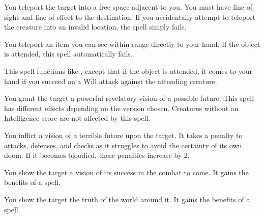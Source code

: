 \spellrng{\rngmed}
\begin{spelleffect}
    You teleport the target into a free space adjacent to you. You must have line of sight and line of effect to the destination. If you accidentally attempt to teleport the creature into an invalid location, the spell simply fails.
\end{spelleffect}

\spellrng{\rngclose}
\begin{spelleffect}
  You teleport an item you can see within range directly to your hand. If the object is attended, this spell automatically fails.
\end{spelleffect}

\spellrng{\rngmed}
\begin{spelleffect}
  This spell functions like , except that if the object is attended, it comes to your hand if you succeed on a Will attack against the attending creature.
\end{spelleffect}

\spellrng{\rngmed}
\spelldur{\durshort}
\begin{spelleffect}
  You grant the target a powerful revelatory vision of a possible future. This spell has different effects depending on the version chosen. Creatures without an Intelligence score are not affected by this spell.
  \par {} You inflict a vision of a terrible future upon the target. It takes a  penalty to attacks, defenses, and checks as it struggles to avoid the certainty of its own doom. If it becomes bloodied, these penalties increase by 2.
  \par {} You show the target a vision of its success in the combat to come. It gains the benefits of a  spell.
  \par {} You show the target the truth of the world around it. It gains the benefits of a  spell.
\end{spelleffect}

